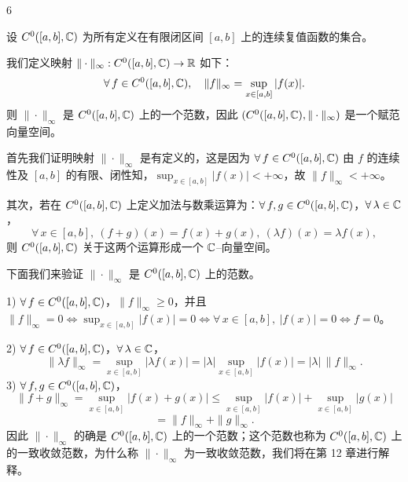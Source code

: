 \begin{sourceexample}{6}

设 $C^0([a,b],\mathbb{C})$ 为所有定义在有限闭区间 $[a,b]$ 上的连续复值函数的集合。

我们定义映射 $\|\cdot\|_{\infty}:C^0([a,b],\mathbb{C})\to\mathbb{R}$ 如下：
\[\forall\,f\in C^0([a,b],\mathbb{C}),\quad\|f\|_{\infty}=\sup_{x\in[a,b]}|f(x)|.\]
则 $\|\cdot\|_{\infty}$ 是 $C^0([a,b],\mathbb{C})$ 上的一个范数，因此 $(C^0([a,b],\mathbb{C}),\|\cdot\|_{\infty})$ 是一个赋范向量空间。

首先我们证明映射 $\|\cdot\|_{\infty}$ 是有定义的，这是因为 $\forall\,f\in C^0([a,b],\mathbb{C})$ 由 $f$ 的连续性及 $[a,b]$ 的有限、闭性知，$\displaystyle\sup_{x\in[a,b]}|f(x)|<+\infty$，故 $\|f\|_{\infty}<+\infty$。

其次，若在 $C^0([a,b],\mathbb{C})$ 上定义加法与数乘运算为：$\forall\,f,g\in C^0([a,b],\mathbb{C})$，$\forall\,\lambda\in\mathbb{C}$，
\[\forall\,x\in[a,b],\ (f+g)(x)=f(x)+g(x),\ (\lambda f)(x)=\lambda f(x),\]
则 $C^0([a,b],\mathbb{C})$ 关于这两个运算形成一个 $\mathbb{C}$--向量空间。

下面我们来验证 $\|\cdot\|_{\infty}$ 是 $C^0([a,b],\mathbb{C})$ 上的范数。

1) $\forall\,f\in C^0([a,b],\mathbb{C})$，$\|f\|_{\infty}\geqslant0$，并且 $\|f\|_{\infty}=0\Longleftrightarrow\displaystyle\sup_{x\in[a,b]}|f(x)|=0\Longleftrightarrow\forall\,x\in[a,b],\ |f(x)|=0\Longleftrightarrow f=0$。

2) $\forall\,f\in C^0([a,b],\mathbb{C})$，$\forall\,\lambda\in\mathbb{C}$，
\[\|\lambda f\|_{\infty}=\sup_{x\in[a,b]}|\lambda f(x)|=|\lambda|\sup_{x\in[a,b]}|f(x)|=|\lambda|\,\|f\|_{\infty}.\]
3) $\forall\,f,g\in C^0([a,b],\mathbb{C})$，
\[\|f+g\|_{\infty}=\sup_{x\in[a,b]}|f(x)+g(x)|\leqslant\sup_{x\in[a,b]}|f(x)|+\sup_{x\in[a,b]}|g(x)|\]
\[=\|f\|_{\infty}+\|g\|_{\infty}.\]
因此 $\|\cdot\|_{\infty}$ 的确是 $C^0([a,b],\mathbb{C})$ 上的一个范数；这个范数也称为 $C^0([a,b],\mathbb{C})$ 上的一致收敛范数，为什么称 $\|\cdot\|_{\infty}$ 为一致收敛范数，我们将在第 12 章进行解释。

\end{sourceexample}

